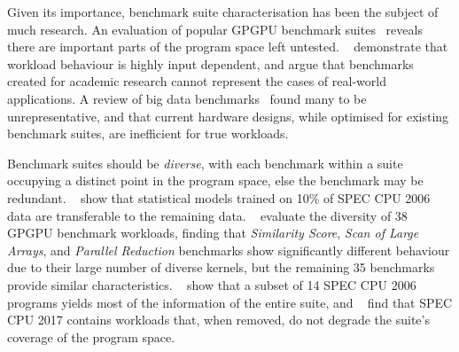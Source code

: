 Given its importance, benchmark suite characterisation has been the subject of much research. An evaluation of popular GPGPU benchmark suites~\cite{Ryoo2015} reveals there are important parts of the program space left untested.
\citeauthor{Xiong2013}~\cite{Xiong2013} demonstrate that workload behaviour is highly input dependent, and argue that benchmarks created for academic research cannot represent the cases of real-world applications.
A review of big data benchmarks~\cite{Ferdman2012} found many to be unrepresentative, and that current hardware designs, while optimised for existing benchmark suites, are inefficient for true workloads.

Benchmark suites should be \emph{diverse}, with each benchmark within a suite occupying a distinct point in the program space, else the benchmark may be redundant.
\citeauthor{Ould-Ahmed-Vall2008}~\cite{Ould-Ahmed-Vall2008} show that statistical models trained on 10\% of SPEC CPU 2006 data are transferable to the remaining data.
\citeauthor{Goswami2010}~\cite{Goswami2010} evaluate the diversity of 38 GPGPU benchmark workloads, finding that \emph{Similarity Score}, \emph{Scan of Large Arrays}, and \emph{Parallel Reduction} benchmarks show significantly different behaviour due to their large number of diverse kernels, but the remaining 35 benchmarks provide similar characteristics.
\citeauthor{Phansalkar2007}~\cite{Phansalkar2007} show that a subset of 14 SPEC CPU 2006 programs yields most of the information of the entire suite, and
\citeauthor{Draft2018}~\cite{Draft2018} find that SPEC CPU 2017 contains workloads that, when removed, do not degrade the suite's coverage of the program space.

